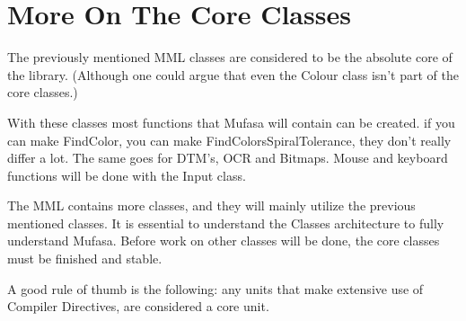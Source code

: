 \documentclass[a4paper, 10pt]{report} %
\begin{document}
\section{More On The Core Classes}

The previously mentioned MML classes are considered to be the absolute core of the library. (Although one could argue that even the Colour class isn't part of the core classes.)

With these classes most functions that Mufasa will contain can be created. if you can make FindColor, you can make FindColorsSpiralTolerance, they don't really differ a lot. The same goes for DTM's, OCR and Bitmaps. Mouse and keyboard functions will be done with the Input class.

The MML contains more classes, and they will mainly utilize the previous mentioned classes.
It is essential to understand the Classes architecture to fully understand Mufasa.
Before work on other classes will be done, the core classes must be finished and stable.

A good rule of thumb is the following: any units that make extensive use of Compiler Directives, are considered a core unit.
\end{document}
